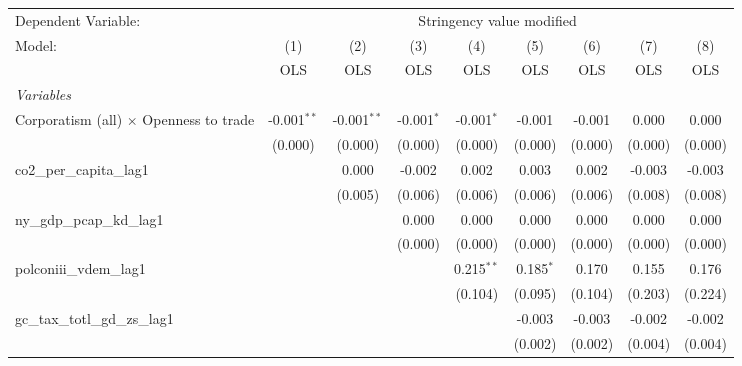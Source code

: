 
\begingroup
\centering
\begin{tabular}{lcccccccc}
   \toprule
   Dependent Variable: & \multicolumn{8}{c}{Stringency value modified}\\
   Model:                                        & (1)           & (2)           & (3)          & (4)          & (5)         & (6)     & (7)          & (8)\\  
                                                 &  OLS          & OLS           & OLS          & OLS          & OLS         & OLS     & OLS          & OLS\\  
   \midrule
   \emph{Variables}\\
   Corporatism (all) $\times$ Openness to trade  & -0.001$^{**}$ & -0.001$^{**}$ & -0.001$^{*}$ & -0.001$^{*}$ & -0.001      & -0.001  & 0.000        & 0.000\\   
                                                 & (0.000)       & (0.000)       & (0.000)      & (0.000)      & (0.000)     & (0.000) & (0.000)      & (0.000)\\   
   co2\_per\_capita\_lag1                        &               & 0.000         & -0.002       & 0.002        & 0.003       & 0.002   & -0.003       & -0.003\\   
                                                 &               & (0.005)       & (0.006)      & (0.006)      & (0.006)     & (0.006) & (0.008)      & (0.008)\\   
   ny\_gdp\_pcap\_kd\_lag1                       &               &               & 0.000        & 0.000        & 0.000       & 0.000   & 0.000        & 0.000\\   
                                                 &               &               & (0.000)      & (0.000)      & (0.000)     & (0.000) & (0.000)      & (0.000)\\   
   polconiii\_vdem\_lag1                         &               &               &              & 0.215$^{**}$ & 0.185$^{*}$ & 0.170   & 0.155        & 0.176\\   
                                                 &               &               &              & (0.104)      & (0.095)     & (0.104) & (0.203)      & (0.224)\\   
   gc\_tax\_totl\_gd\_zs\_lag1                   &               &               &              &              & -0.003      & -0.003  & -0.002       & -0.002\\   
                                                 &               &               &              &              & (0.002)     & (0.002) & (0.004)      & (0.004)\\   

\end{tabular}
